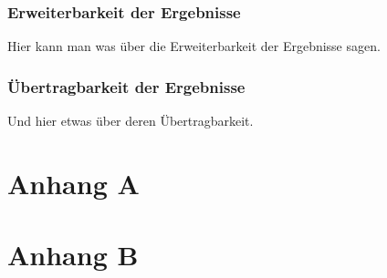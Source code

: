 \documentclass[oneside]{ausarbeitung}
\begin{document}
\subsection{Erweiterbarkeit der Ergebnisse}
\label{sub:erweiterbarkeit}

Hier kann man was über die Erweiterbarkeit der Ergebnisse sagen.

\subsection{Übertragbarkeit der Ergebnisse}
\label{sub:uebertragbarkeit}

Und hier etwas über deren Übertragbarkeit.

\appendix

\printbibliography[heading=bibintoc]

\chapter{Anhang A}

\chapter{Anhang B}
\end{document}
